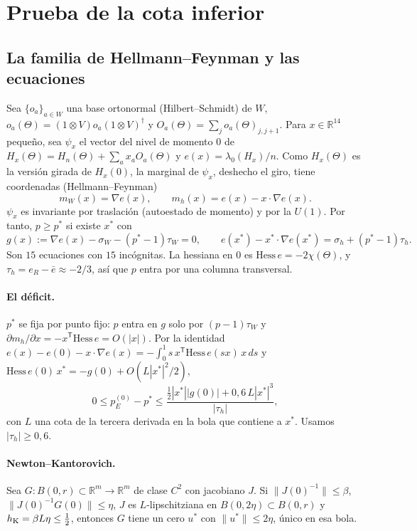 \documentclass[11pt,a4paper]{article}
\theoremstyle{definition}
\theoremstyle{remark}
\newcommand{\pE}{p_{E}}
\begin{document}
\section{Prueba de la cota inferior}\label{sec:prueba}

\subsection{La familia de Hellmann--Feynman y las ecuaciones}

Sea $\{o_a\}_{a\in W}$ una base ortonormal (Hilbert--Schmidt) de $W$, $o_a(\Theta)=(1\otimes V)o_a(1\otimes
V)^\dagger$ y $O_a(\Theta)=\sum_jo_a(\Theta)_{j,j+1}$. Para $x\in\mathbb R^{14}$ pequeño, sea $\psi_x$ el
vector del nivel de momento $0$ de $H_x(\Theta)=H_n(\Theta)+\sum_ax_aO_a(\Theta)$ y
$e(x)=\lambda_0(H_x)/n$. Como $H_x(\Theta)$ es la versión girada de $H_x(0)$, la marginal de $\psi_x$,
deshecho el giro, tiene coordenadas (Hellmann--Feynman)
\[
  m_W(x)=\nabla e(x),\qquad m_h(x)=e(x)-x\cdot\nabla e(x).
\]
$\psi_x$ es invariante por traslación (autoestado de momento) y por la $U(1)$. Por tanto,
$p\ge p^*$ si existe $x^*$ con
\begin{equation}\label{eq:sistema}
  g(x):=\nabla e(x)-\sigma_W-(p^*-1)\tau_W=0,\qquad e(x^*)-x^*\cdot\nabla e(x^*)=\sigma_h+(p^*-1)\tau_h .
\end{equation}
Son $15$ ecuaciones con $15$ incógnitas. La hessiana en $0$ es $\mathrm{Hess}\,e=-2\chi(\Theta)$, y
$\tau_h=e_R-\bar e\approx-2/3$, así que $p$ entra por una columna transversal.

\paragraph{El déficit.} $p^*$ se fija por punto fijo: $p$ entra en $g$ solo por $(p-1)\tau_W$ y
$\partial m_h/\partial x=-x^{\mathsf T}\mathrm{Hess}\,e=O(|x|)$. Por la identidad
$e(x)-e(0)-x\cdot\nabla e(x)=-\int_0^1s\,x^{\mathsf T}\mathrm{Hess}\,e(sx)\,x\,ds$ y
$\mathrm{Hess}\,e(0)\,x^*=-g(0)+O(L|x^*|^2/2)$,
\begin{equation}\label{eq:deficit}
  0\le\pE^{(0)}-p^*\le\frac{\tfrac12|x^*||g(0)|+0{,}6\,L|x^*|^3}{|\tau_h|},
\end{equation}
con $L$ una cota de la tercera derivada en la bola que contiene a $x^*$. Usamos $|\tau_h|\ge0{,}6$.

\paragraph{Newton--Kantorovich.} Sea $G:B(0,r)\subset\mathbb R^m\to\mathbb R^m$ de clase $C^2$ con
jacobiano $J$. Si $\|J(0)^{-1}\|\le\beta$, $\|J(0)^{-1}G(0)\|\le\eta$, $J$ es $L$-lipschitziana en
$B(0,2\eta)\subset B(0,r)$ y $h_{\rm K}=\beta L\eta\le\frac12$, entonces $G$ tiene un cero $u^*$ con
$\|u^*\|\le2\eta$, único en esa bola.
\end{document}
